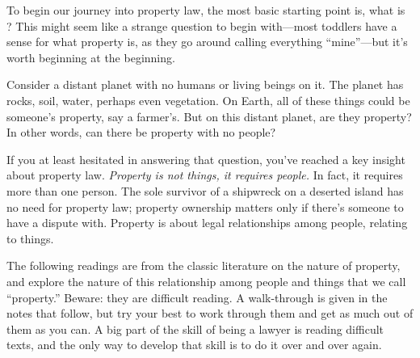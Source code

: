 To begin our journey into property law, the most basic starting point is, what
is ? This might seem like a strange question to begin with---most
toddlers have a sense for what property is, as they go around calling everything
``mine''---but it's worth beginning at the beginning.

Consider a distant planet with no humans or living beings on it. The planet has
rocks, soil, water, perhaps even vegetation. On Earth, all of these things could
be someone's property, say a farmer's. But on this distant planet, are they
property? In other words, can there be property with no people?

If you at least hesitated in answering that question, you've reached a key
insight about property law. \emph{Property is not things, it requires people.}
In fact, it requires more than one person. The sole survivor of a shipwreck on a
deserted island has no need for property law; property ownership matters only if
there's someone to have a dispute with.
Property is about legal relationships among people, relating to things.

The following readings are from the classic literature on the nature of
property, and explore the nature of this relationship among people and things
that we call ``property.'' Beware: they are difficult reading. A walk-through is
given in the notes that follow, but try your best to work through them and get
as much out of them as you can. A big part of the skill of being a lawyer is
reading difficult texts, and the only way to develop that skill is to do it over
and over again.

